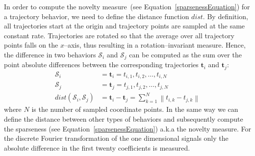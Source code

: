 \documentclass{sig-alternate}
\begin{document}
In order to compute the novelty measure~(see Equation~\eqref{sparsenessEquation}) for a trajectory behavior, we need to define the distance function $dist$. By definition, all trajectories start at the origin and trajectory points are sampled at the same constant rate. Trajectories are rotated so that the average over all trajectory points falls on the $x$--axis, thus resulting in a rotation--invariant measure. Hence, the difference in two behaviors $\mathcal{S}_i$ and $\mathcal{S}_j$ can be computed as the sum over the point absolute differences between the corresponding trajectories $\bm{t}_i$ and $\bm{t}_j$: 
\begin{align}
\mathcal{S}_i &= \bm{t}_i = t_{i,1}, t_{i,2}, \ldots, t_{i,N}\\
\mathcal{S}_j &= \bm{t}_j = t_{j,1}, t_{j,2}, \ldots, t_{j,N}\\
dist(\mathcal{S}_i, \mathcal{S}_j) &= \bm{t}_i - \bm{t}_j = \sum_{k=1}^{N} \left\lVert t_{i, k} - t_{j, k} \right\rVert
\end{align}
where $N$ is the number of sampled coordinate points. In the same way we can define the distance between other types of behaviors and subsequently compute the sparseness (see Equation~\eqref{sparsenessEquation}) a.k.a the novelty measure. For the discrete Fourier transformation of the one dimensional signals only the absolute difference in the first twenty coefficients is measured.

\end{document}
